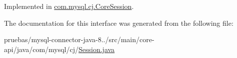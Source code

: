 Implemented in \mbox{\hyperlink{classcom_1_1mysql_1_1cj_1_1_core_session_ac8cdb7493dd85ef25abc436061e704eb}{com.\+mysql.\+cj.\+Core\+Session}}.



The documentation for this interface was generated from the following file\+:\begin{DoxyCompactItemize}
\item 
pruebas/mysql-\/connector-\/java-\/8../src/main/core-\/api/java/com/mysql/cj/\mbox{\hyperlink{core-api_2java_2com_2mysql_2cj_2_session_8java}{Session.\+java}}\end{DoxyCompactItemize}
